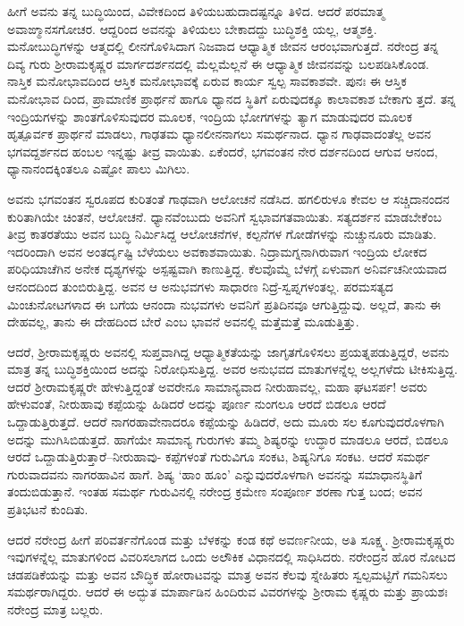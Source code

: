ಹೀಗೆ ಅವನು ತನ್ನ ಬುದ್ಧಿಯಿಂದ, ವಿವೇಕದಿಂದ ತಿಳಿಯಬಹುದಾದಷ್ಟನ್ನೂ ತಿಳಿದ. ಆದರೆ ಪರಮಾತ್ಮ ಅವಾಙ್ಮಾನಸಗೋಚರ. ಆದ್ದರಿಂದ ಅವನನ್ನು ತಿಳಿಯಲು ಬೇಕಾದದ್ದು ಬುದ್ಧಿಶಕ್ತಿ ಯಲ್ಲ, ಆತ್ಮಶಕ್ತಿ. ಮನೋಬುದ್ಧಿಗಳನ್ನು ಆತ್ಮದಲ್ಲಿ ಲೀನಗೊಳಿಸಿದಾಗ ನಿಜವಾದ ಆಧ್ಯಾತ್ಮಿಕ ಜೀವನ ಆರಂಭವಾಗುತ್ತದೆ. ನರೇಂದ್ರ ತನ್ನ ದಿವ್ಯ ಗುರು ಶ್ರೀರಾಮಕೃಷ್ಣರ ಮಾರ್ಗದರ್ಶನದಲ್ಲಿ ಮೆಲ್ಲಮೆಲ್ಲನೆ ಈ ಆಧ್ಯಾತ್ಮಿಕ ಜೀವನವನ್ನು ಬಲಪಡಿಸಿಕೊಂಡ. ನಾಸ್ತಿಕ ಮನೋಭಾವದಿಂದ ಆಸ್ತಿಕ ಮನೋಭಾವಕ್ಕೆ ಏರುವ ಕಾರ್ಯ ಸ್ವಲ್ಪ ಸಾವಕಾಶವೇ. ಪುನಃ ಈ ಆಸ್ತಿಕ ಮನೋಭಾವ ದಿಂದ, ಪ್ರಾಮಾಣಿಕ ಪ್ರಾರ್ಥನೆ ಹಾಗೂ ಧ್ಯಾನದ ಸ್ಥಿತಿಗೆ ಏರುವುದಕ್ಕೂ ಕಾಲಾವಕಾಶ ಬೇಕಾಗು ತ್ತದೆ. ತನ್ನ ಇಂದ್ರಿಯಗಳನ್ನು ಶಾಂತಗೊಳಿಸುವುದರ ಮೂಲಕ, ಇಂದ್ರಿಯ ಭೋಗಗಳನ್ನು ತ್ಯಾಗ ಮಾಡುವುದರ ಮೂಲಕ ಹೃತ್ಪೂರ್ವಕ ಪ್ರಾರ್ಥನೆ ಮಾಡಲು, ಗಾಢತಮ ಧ್ಯಾನಲೀನನಾಗಲು ಸಮರ್ಥನಾದ. ಧ್ಯಾನ ಗಾಢವಾದಂತೆಲ್ಲ ಅವನ ಭಗವದ್ದರ್ಶನದ ಹಂಬಲ ಇನ್ನಷ್ಟು ತೀವ್ರ ವಾಯಿತು. ಏಕೆಂದರೆ, ಭಗವಂತನ ನೇರ ದರ್ಶನದಿಂದ ಆಗುವ ಆನಂದ, ಧ್ಯಾನಾನಂದಕ್ಕಿಂತಲೂ ಎಷ್ಟೋ ಪಾಲು ಮಿಗಿಲು.

ಅವನು ಭಗವಂತನ ಸ್ವರೂಪದ ಕುರಿತಂತೆ ಗಾಢವಾಗಿ ಆಲೋಚನೆ ನಡೆಸಿದ. ಹಗಲಿರುಳೂ ಕೇವಲ ಆ ಸಚ್ಚಿದಾನಂದನ ಕುರಿತಾಗಿಯೇ ಚಿಂತನೆ, ಆಲೋಚನೆ. ಧ್ಯಾನವೆಂಬುದು ಅವನಿಗೆ ಸ್ವಭಾವಗತವಾಯಿತು. ಸತ್ಯದರ್ಶನ ಮಾಡಬೇಕೆಂಬ ತೀವ್ರ ಕಾತರತೆಯು ಅವನ ಬುದ್ಧಿ ನಿರ್ಮಿಸಿದ್ದ ಆಲೋಚನೆಗಳ, ಕಲ್ಪನೆಗಳ ಗೋಡೆಗಳನ್ನು ನುಚ್ಚುನೂರು ಮಾಡಿತು. ಇದರಿಂದಾಗಿ ಅವನ ಅಂತರ್ದೃಷ್ಟಿ ಬೆಳೆಯಲು ಅವಕಾಶವಾಯಿತು. ನಿದ್ರಾಮಗ್ನನಾಗಿರುವಾಗ ಇಂದ್ರಿಯ ಲೋಕದ ಪರಿಧಿಯಾಚೆಗಿನ ಅನೇಕ ದೃಶ್ಯಗಳನ್ನು ಅಸ್ಪಷ್ಟವಾಗಿ ಕಾಣುತ್ತಿದ್ದ. ಕೆಲವೊಮ್ಮೆ ಬೆಳಗ್ಗೆ ಏಳುವಾಗ ಅನಿರ್ವಚನೀಯವಾದ ಆನಂದದಿಂದ ತುಂಬಿರುತ್ತಿದ್ದ. ಅವನ ಆ ಅನುಭವಗಳು ಸಾಧಾರಣ ನಿದ್ರೆ-ಸ್ವಪ್ನಗಳಂತಲ್ಲ. ಪರಮಸತ್ಯದ ಮಿಂಚುನೋಟಗಳಾದ ಈ ಬಗೆಯ ಆನಂದಾ ನುಭವಗಳು ಅವನಿಗೆ ಪ್ರತಿದಿನವೂ ಆಗುತ್ತಿದ್ದುವು. ಅಲ್ಲದೆ, ತಾನು ಈ ದೇಹವಲ್ಲ, ತಾನು ಈ ದೇಹದಿಂದ ಬೇರೆ ಎಂಬ ಭಾವನೆ ಅವನಲ್ಲಿ ಮತ್ತೆಮತ್ತೆ ಮೂಡುತ್ತಿತ್ತು.

ಆದರೆ, ಶ್ರೀರಾಮಕೃಷ್ಣರು ಅವನಲ್ಲಿ ಸುಪ್ತವಾಗಿದ್ದ ಆಧ್ಯಾತ್ಮಿಕತೆಯನ್ನು ಜಾಗೃತಗೊಳಿಸಲು ಪ್ರಯತ್ನಪಡುತ್ತಿದ್ದರೆ, ಅವನು ಮಾತ್ರ ತನ್ನ ಬುದ್ಧಿಶಕ್ತಿಯಿಂದ ಅದನ್ನು ನಿರೋಧಿಸುತ್ತಿದ್ದ. ಅವರ ಅನುಭವದ ಮಾತುಗಳನ್ನೆಲ್ಲ ಅಲ್ಲಗಳೆದು ಟೀಕಿಸುತ್ತಿದ್ದ. ಆದರೆ ಶ್ರೀರಾಮಕೃಷ್ಣರೇ ಹೇಳುತ್ತಿದ್ದಂತೆ ಅವರೇನೂ ಸಾಮಾನ್ಯವಾದ ನೀರುಹಾವಲ್ಲ, ಮಹಾ ಘಟಸರ್ಪ! ಅವರು ಹೇಳುವಂತೆ, ನೀರುಹಾವು ಕಪ್ಪೆಯನ್ನು ಹಿಡಿದರೆ ಅದನ್ನು ಪೂರ್ಣ ನುಂಗಲೂ ಆರದೆ ಬಿಡಲೂ ಆರದೆ ಒದ್ದಾಡುತ್ತಿರುತ್ತದೆ. ಆದರೆ ನಾಗರಹಾವೇನಾದರೂ ಕಪ್ಪೆಯನ್ನು ಹಿಡಿದರೆ, ಅದು ಮೂರು ಸಲ ಕೂಗುವುದರೊಳಗಾಗಿ ಅದನ್ನು ಮುಗಿಸಿಬಿಡುತ್ತದೆ. ಹಾಗೆಯೇ ಸಾಮಾನ್ಯ ಗುರುಗಳು ತಮ್ಮ ಶಿಷ್ಯರನ್ನು ಉದ್ಧಾರ ಮಾಡಲೂ ಆರದೆ, ಬಿಡಲೂ ಆರದೆ ಒದ್ದಾಡುತ್ತಿರುತ್ತಾರೆ–ನೀರುಹಾವು- ಕಪ್ಪೆಗಳಂತೆ ಗುರುವಿಗೂ ಸಂಕಟ, ಶಿಷ್ಯನಿಗೂ ಸಂಕಟ. ಆದರೆ ಸಮರ್ಥ ಗುರುವಾದವನು ನಾಗರಹಾವಿನ ಹಾಗೆ. ಶಿಷ್ಯ ‘ಹಾಂ ಹೂಂ’ ಎನ್ನುವುದರೊಳಗಾಗಿ ಅವನನ್ನು ಸಮಾಧಾನಸ್ಥಿತಿಗೆ ತಂದುಬಿಡುತ್ತಾನೆ. ಇಂತಹ ಸಮರ್ಥ ಗುರುವಿನಲ್ಲಿ ನರೇಂದ್ರ ಕ್ರಮೇಣ ಸಂಪೂರ್ಣ ಶರಣಾ ಗುತ್ತ ಬಂದ; ಅವನ ಪ್ರತಿಭಟನೆ ಕುಂದಿತು.

ಆದರೆ ನರೇಂದ್ರ ಹೀಗೆ ಪರಿವರ್ತನೆಗೊಂಡ ಮತ್ತು ಬೆಳಕನ್ನು ಕಂಡ ಕಥೆ ಅವರ್ಣನೀಯ, ಅತಿ ಸೂಕ್ಷ್ಮ. ಶ್ರೀರಾಮಕೃಷ್ಣರು ಇವುಗಳನ್ನೆಲ್ಲ ಮಾತುಗಳಿಂದ ವಿವರಿಸಲಾಗದ ಒಂದು ಅಲೌಕಿಕ ವಿಧಾನದಲ್ಲಿ ಸಾಧಿಸಿದರು. ನರೇಂದ್ರನ ಹೊರ ನೋಟದ ಚಡಪಡಿಕೆಯನ್ನು ಮತ್ತು ಅವನ ಬೌದ್ಧಿಕ ಹೋರಾಟವನ್ನು ಮಾತ್ರ ಅವನ ಕೆಲವು ಸ್ನೇಹಿತರು ಸ್ವಲ್ಪಮಟ್ಟಿಗೆ ಗಮನಿಸಲು ಸಮರ್ಥರಾಗಿದ್ದರು. ಆದರೆ ಈ ಅದ್ಭುತ ಮಾರ್ಪಾಡಿನ ಹಿಂದಿರುವ ವಿವರಗಳನ್ನು ಶ್ರೀರಾಮ ಕೃಷ್ಣರು ಮತ್ತು ಪ್ರಾಯಶಃ ನರೇಂದ್ರ ಮಾತ್ರ ಬಲ್ಲರು.

